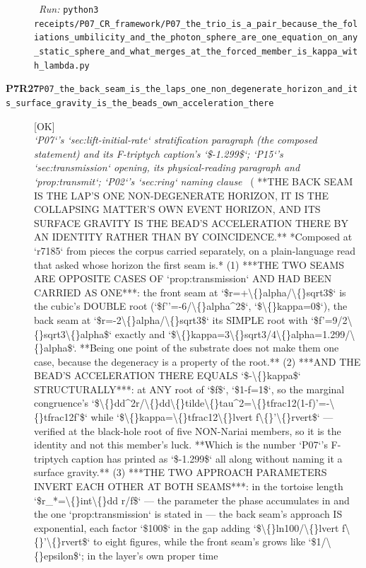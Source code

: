 \begin{description}
\ \emph{Run:} \texttt{python3 receipts/P07\_CR\_framework/P07\_the\_trio\_is\_a\_pair\_because\_the\_foliations\_umbilicity\_and\_the\_photon\_sphere\_are\_one\_equation\_on\_any\_static\_sphere\_and\_what\_merges\_at\_the\_forced\_member\_is\_kappa\_with\_lambda.py}
\item[\rcptlabel{P07_the_back_seam_is_the_laps_one_non_degenerate_horizon_and_its_surface_gravity_is_the_beads_own_acceleration_there}{P7R27}\textbf{P7R27}\quad\texttt{P07\_the\_back\_seam\_is\_the\_laps\_one\_non\_degenerate\_horizon\_and\_its\_surface\_gravity\_is\_the\_beads\_own\_acceleration\_there}]\hfill\textsf{[OK]}\\
\textit{`P07`'s `sec:lift-initial-rate` stratification paragraph (the composed statement) and its F-triptych caption's `\$-1.299\$`; `P15`'s `sec:transmission` opening, its physical-reading paragraph and `prop:transmit`; `P02`'s `sec:ring` naming clause} \ ( **THE BACK SEAM IS THE LAP'S ONE NON-DEGENERATE HORIZON, IT IS THE COLLAPSING MATTER'S OWN EVENT HORIZON, AND ITS SURFACE GRAVITY IS THE BEAD'S ACCELERATION THERE BY AN IDENTITY RATHER THAN BY COINCIDENCE.** *Composed at `r7185` from pieces the corpus carried separately, on a plain-language read that asked whose horizon the first seam is.* (1) ***THE TWO SEAMS ARE OPPOSITE CASES OF `prop:transmission` AND HAD BEEN CARRIED AS ONE***: the front seam at `\$r=+\textbackslash\{\}alpha/\textbackslash\{\}sqrt3\$` is the cubic's DOUBLE root (`\$f''=-6/\textbackslash\{\}alpha\textasciicircum{}2\$`, `\$\textbackslash\{\}kappa=0\$`), the back seam at `\$r=-2\textbackslash\{\}alpha/\textbackslash\{\}sqrt3\$` its SIMPLE root with `\$f'=9/2\textbackslash\{\}sqrt3\textbackslash\{\}alpha\$` exactly and `\$\textbackslash\{\}kappa=3\textbackslash\{\}sqrt3/4\textbackslash\{\}alpha=1.299/\textbackslash\{\}alpha\$`. **Being one point of the substrate does not make them one case, because the degeneracy is a property of the root.** (2) ***AND THE BEAD'S ACCELERATION THERE EQUALS `\$-\textbackslash\{\}kappa\$` STRUCTURALLY***: at ANY root of `\$f\$`, `\$1-f=1\$`, so the marginal congruence's `\$\textbackslash\{\}dd\textasciicircum{}2r/\textbackslash\{\}dd\textbackslash\{\}tilde\textbackslash\{\}tau\textasciicircum{}2=\textbackslash\{\}tfrac12(1-f)'=-\textbackslash\{\}tfrac12f'\$` while `\$\textbackslash\{\}kappa=\textbackslash\{\}tfrac12\textbackslash\{\}lvert f\textbackslash\{\}'\textbackslash\{\}rvert\$` --- verified at the black-hole root of five NON-Nariai members, so it is the identity and not this member's luck. **Which is the number `P07`'s F-triptych caption has printed as `\$-1.299\$` all along without naming it a surface gravity.** (3) ***THE TWO APPROACH PARAMETERS INVERT EACH OTHER AT BOTH SEAMS***: in the tortoise length `\$r\_*=\textbackslash\{\}int\textbackslash\{\}dd r/f\$` --- the parameter the phase accumulates in and the one `prop:transmission` is stated in --- the back seam's approach IS exponential, each factor `\$100\$` in the gap adding `\$\textbackslash\{\}ln100/\textbackslash\{\}lvert f\textbackslash\{\}'\textbackslash\{\}rvert\$` to eight figures, while the front seam's grows like `\$1/\textbackslash\{\}epsilon\$`; in the layer's own proper time 
\end{description}
